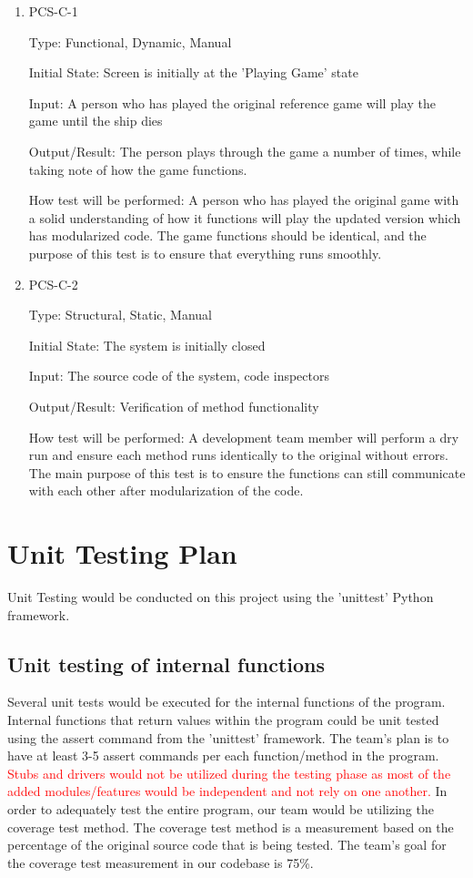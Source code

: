 \documentclass[12pt, titlepage]{article}
\begin{document}
\begin{enumerate}

\item{PCS-C-1\\}

Type: Functional, Dynamic, Manual
					
Initial State: Screen is initially at the 'Playing Game' state
					
Input: A person who has played the original reference game will play the game until the ship dies
					
Output/Result: The person plays through the game a number of times, while taking note of how the game functions.
					
How test will be performed: A person who has played the original game with a solid understanding of how it functions will play the updated version which has modularized code. The game functions should be identical, and the purpose of this test is to ensure that everything runs smoothly. 
					
\item{PCS-C-2\\}

Type: Structural, Static, Manual
					
Initial State: The system is initially closed
					
Input: The source code of the system, code inspectors 
					
Output/Result: Verification of method functionality
					
How test will be performed: A development team member will perform a dry run and ensure each method runs identically to the original without errors. The main purpose of this test is to ensure the functions can still communicate with each other after modularization of the code.

\end{enumerate}

\section{Unit Testing Plan}
Unit Testing would be conducted on this project using the 'unittest' Python framework.
		
\subsection{Unit testing of internal functions}
Several unit tests would be executed for the internal functions of the program. Internal functions that return values within the program could be unit tested using the assert command from the 'unittest' framework. The team's plan is to have at least 3-5 assert commands per each function/method in the program. \textcolor{red}{Stubs and drivers would not be utilized during the testing phase as most of the added modules/features would be independent and not rely on one another.} In order to adequately test the entire program, our team would be utilizing the coverage test method. The coverage test method is a measurement based on the percentage of the original source code that is being tested. The team's goal for the coverage test measurement in our codebase is 75\%. 
\end{document}
